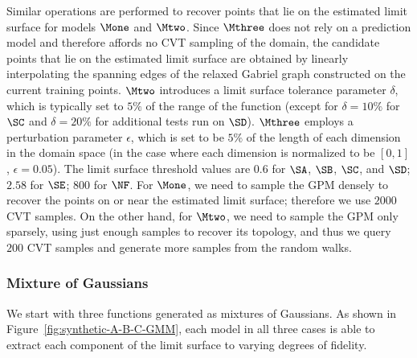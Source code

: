 Similar operations are performed to recover points that lie on the estimated limit surface for models $\Mone$ and $\Mtwo$.
%
Since $\Mthree$ does not rely on a prediction model and therefore affords no CVT sampling of the domain, the candidate points that lie on the estimated limit surface are obtained by linearly interpolating the spanning edges of the relaxed Gabriel graph constructed on the current training points.
%
$\Mtwo$ introduces a limit surface tolerance parameter $\delta$, which is typically set to $5\%$ of the range of the function (except for $\delta = 10\%$ for $\SC$ and $\delta = 20\%$ for additional tests run on $\SD$).
%
$\Mthree$ employs a perturbation parameter $\epsilon$, which is set to be $5\%$ of the length of each dimension in the domain space (in the case where each dimension is normalized to be $[0,1]$, $\epsilon = 0.05$).
%
The limit surface threshold values are $0.6$ for $\SA$, $\SB$, $\SC$, and $\SD$;
%
$2.58$ for $\SE$; $800$ for $\NF$.
%
For $\Mone$, we need to sample the GPM densely to recover the points on or near the estimated limit surface; therefore we use $2000$ CVT samples.
%
On the other hand, for $\Mtwo$, we need to sample the GPM only sparsely, using just enough samples to recover its topology, and thus we query $200$ CVT samples and generate more samples from the random walks.


\subsubsection{Mixture of Gaussians}

We start with three functions generated as mixtures of Gaussians.
%
As shown in Figure~\ref{fig:synthetic-A-B-C-GMM}, each model in all three cases is able to extract each component of the limit surface to varying degrees of fidelity.

